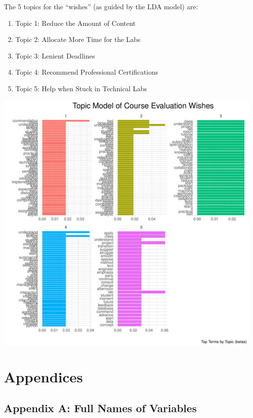 \documentclass[
]{article}
\begin{document}
\newpage

The 5 topics for the ``wishes'' (as guided by the LDA model) are:

\begin{enumerate}
\def\labelenumi{\arabic{enumi}.}
\item
  Topic 1: Reduce the Amount of Content
\item
  Topic 2: Allocate More Time for the Labs
\item
  Topic 3: Lenient Deadlines
\item
  Topic 4: Recommend Professional Certifications
\item
  Topic 5: Help when Stuck in Technical Labs
\end{enumerate}

\includegraphics{10.b.BBT4206-End-SemesterCourseEvaluation-20230821-20231128-BI2-BBIT4-2_files/figure-latex/visualizations_for_wishes_topic_modelling-1.pdf}

\newpage

\section{Appendices}\label{appendices}

\subsection{Appendix A: Full Names of
Variables}\label{appendix-a-full-names-of-variables}
\end{document}
